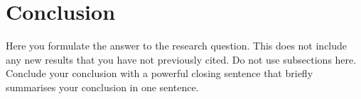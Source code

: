 \chapter{Conclusion}

Here you formulate the answer to the research question.
This does not include any new results that you have not previously cited. Do not use subsections here.
Conclude your conclusion with a powerful closing sentence that briefly summarises your conclusion in one sentence.
